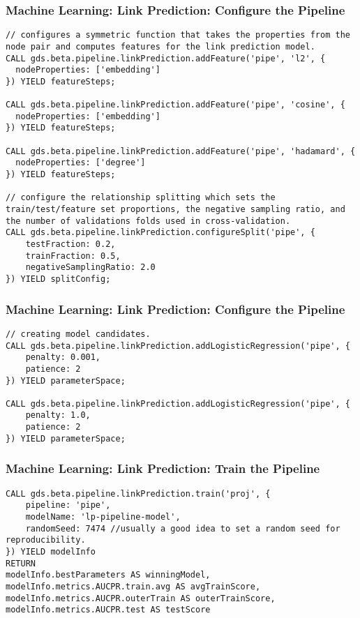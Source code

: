 \begin{frame}[fragile]\frametitle{Machine Learning: Link Prediction: Configure the Pipeline}

\begin{lstlisting}
// configures a symmetric function that takes the properties from the node pair and computes features for the link prediction model. 
CALL gds.beta.pipeline.linkPrediction.addFeature('pipe', 'l2', {
  nodeProperties: ['embedding']
}) YIELD featureSteps;

CALL gds.beta.pipeline.linkPrediction.addFeature('pipe', 'cosine', {
  nodeProperties: ['embedding']
}) YIELD featureSteps;

CALL gds.beta.pipeline.linkPrediction.addFeature('pipe', 'hadamard', {
  nodeProperties: ['degree']
}) YIELD featureSteps;

// configure the relationship splitting which sets the train/test/feature set proportions, the negative sampling ratio, and the number of validations folds used in cross-validation. 
CALL gds.beta.pipeline.linkPrediction.configureSplit('pipe', {
    testFraction: 0.2,
    trainFraction: 0.5,
    negativeSamplingRatio: 2.0
}) YIELD splitConfig;
\end{lstlisting}

\end{frame}

\begin{frame}[fragile]\frametitle{Machine Learning: Link Prediction: Configure the Pipeline}

\begin{lstlisting}
// creating model candidates. 
CALL gds.beta.pipeline.linkPrediction.addLogisticRegression('pipe', {
    penalty: 0.001,
    patience: 2
}) YIELD parameterSpace;

CALL gds.beta.pipeline.linkPrediction.addLogisticRegression('pipe', {
    penalty: 1.0,
    patience: 2
}) YIELD parameterSpace;
\end{lstlisting}

\end{frame}

\begin{frame}[fragile]\frametitle{Machine Learning: Link Prediction: Train the Pipeline}

\begin{lstlisting}
CALL gds.beta.pipeline.linkPrediction.train('proj', {
    pipeline: 'pipe',
    modelName: 'lp-pipeline-model',
    randomSeed: 7474 //usually a good idea to set a random seed for reproducibility.
}) YIELD modelInfo
RETURN
modelInfo.bestParameters AS winningModel,
modelInfo.metrics.AUCPR.train.avg AS avgTrainScore,
modelInfo.metrics.AUCPR.outerTrain AS outerTrainScore,
modelInfo.metrics.AUCPR.test AS testScore
\end{lstlisting}

\end{frame}

